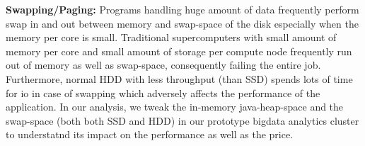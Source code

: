 \textbf{Swapping/Paging:}
Programs handling huge amount of data frequently perform swap in and out between memory and swap-space of the disk especially when the memory per core is small.
Traditional supercomputers with small amount of memory per core and small amount of storage per compute node frequently run out of memory as well as swap-space, consequently failing the entire job.
Furthermore, normal HDD with less throughput (than SSD) spends lots of time for io in case of swapping which adversely affects the performance of the application.
In our analysis, we tweak the in-memory java-heap-space and the swap-space (both both SSD and HDD) in our prototype bigdata analytics cluster to understatnd its impact on the performance as well as the price.